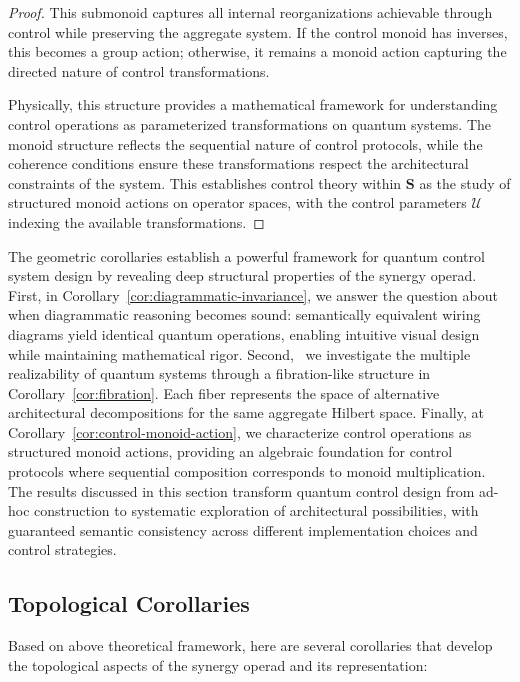 \documentclass[11pt]{article}
\begin{document}
\begin{proof}
This submonoid captures all internal reorganizations achievable through control while preserving the aggregate system. If the control monoid has inverses, this becomes a group action; otherwise, it remains a monoid action capturing the directed nature of control transformations.

Physically, this structure provides a mathematical framework for understanding control operations as parameterized transformations on quantum systems. The monoid structure reflects the sequential nature of control protocols, while the coherence conditions ensure these transformations respect the architectural constraints of the system. This establishes control theory within $\mathbf{S}$ as the study of structured monoid actions on operator spaces, with the control parameters $\mathcal{U}$ indexing the available transformations.
\end{proof}

The geometric corollaries establish a powerful framework for quantum control system design by revealing deep structural properties of the synergy operad. First, in Corollary~\ref{cor:diagrammatic-invariance}, we answer the question about when diagrammatic reasoning becomes sound: semantically equivalent wiring diagrams yield identical quantum operations, enabling intuitive visual design while maintaining mathematical rigor. Second,  we investigate the multiple realizability of quantum systems through a fibration-like structure in Corollary~\ref{cor:fibration}. Each fiber represents the space of alternative architectural decompositions for the same aggregate Hilbert space. Finally, at Corollary~\ref{cor:control-monoid-action}, we characterize control operations as structured monoid actions, providing an algebraic foundation for control protocols where sequential composition corresponds to monoid multiplication. The results discussed in this section transform quantum control design from ad-hoc construction to systematic exploration of architectural possibilities, with guaranteed semantic consistency across different implementation choices and control strategies.


\subsection{Topological Corollaries}\label{sec:Topological Corollaries}

Based on above theoretical framework, here are several corollaries that develop the topological aspects of the synergy operad and its representation:
\end{document}
